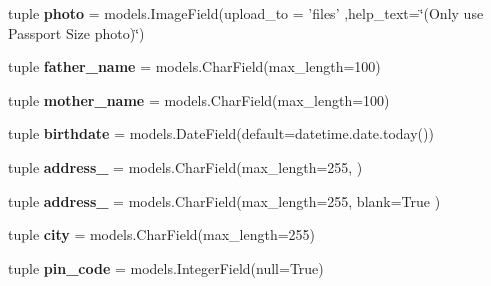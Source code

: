 \begin{DoxyCompactItemize}
\item 
\hypertarget{classsouvenir_1_1student_1_1models_1_1Profile_a9d2e137af325786eaf30e18769070c45}{tuple {\bfseries photo} = models.\-Image\-Field(upload\-\_\-to = 'files' ,help\-\_\-text=\char`\"{}(Only use Passport Size photo)\char`\"{})}\label{classsouvenir_1_1student_1_1models_1_1Profile_a9d2e137af325786eaf30e18769070c45}

\item 
\hypertarget{classsouvenir_1_1student_1_1models_1_1Profile_a47f5441862c3ae2d1c2a296b4533fe4e}{tuple {\bfseries father\-\_\-name} = models.\-Char\-Field(max\-\_\-length=100)}\label{classsouvenir_1_1student_1_1models_1_1Profile_a47f5441862c3ae2d1c2a296b4533fe4e}

\item 
\hypertarget{classsouvenir_1_1student_1_1models_1_1Profile_a83c9dc9685ec6298bea2f8d324c00dff}{tuple {\bfseries mother\-\_\-name} = models.\-Char\-Field(max\-\_\-length=100)}\label{classsouvenir_1_1student_1_1models_1_1Profile_a83c9dc9685ec6298bea2f8d324c00dff}

\item 
\hypertarget{classsouvenir_1_1student_1_1models_1_1Profile_a8bbeaa08370dc996e4d94278e67bcaf9}{tuple {\bfseries birthdate} = models.\-Date\-Field(default=datetime.\-date.\-today())}\label{classsouvenir_1_1student_1_1models_1_1Profile_a8bbeaa08370dc996e4d94278e67bcaf9}

\item 
\hypertarget{classsouvenir_1_1student_1_1models_1_1Profile_ac3488fa469a88396f201120398de7305}{tuple {\bfseries address\-\_} = models.\-Char\-Field(max\-\_\-length=255, )}\label{classsouvenir_1_1student_1_1models_1_1Profile_ac3488fa469a88396f201120398de7305}

\item 
\hypertarget{classsouvenir_1_1student_1_1models_1_1Profile_a30775c5cb25c1a83cb98e946f5003627}{tuple {\bfseries address\-\_} = models.\-Char\-Field(max\-\_\-length=255, blank=True )}\label{classsouvenir_1_1student_1_1models_1_1Profile_a30775c5cb25c1a83cb98e946f5003627}

\item 
\hypertarget{classsouvenir_1_1student_1_1models_1_1Profile_af59764ef4ccf29d1905c64f21a68f8e2}{tuple {\bfseries city} = models.\-Char\-Field(max\-\_\-length=255)}\label{classsouvenir_1_1student_1_1models_1_1Profile_af59764ef4ccf29d1905c64f21a68f8e2}

\item 
\hypertarget{classsouvenir_1_1student_1_1models_1_1Profile_aa39276118e6962dbf3543dfad7785970}{tuple {\bfseries pin\-\_\-code} = models.\-Integer\-Field(null=True)}\label{classsouvenir_1_1student_1_1models_1_1Profile_aa39276118e6962dbf3543dfad7785970}


\end{DoxyCompactItemize}
